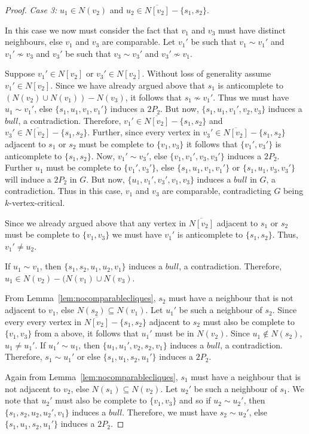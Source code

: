 \documentclass[11pt]{article}
\theoremstyle{definition}
\begin{document}
\begin{proof}
\noindent \textit{Case 3:} $u_1\in N(v_2)$ and $u_2\in\overline{N[v_2]}-\{s_1,s_2\}$.

In this case we now must consider the fact that $v_1$ and $v_3$ must have distinct neighbours, else $v_1$ and $v_3$ are comparable. Let $v_1'$ be such that $v_1\sim v_1'$ and $v_1'\nsim v_3$ and $v_3'$ be such that $v_3\sim v_3'$ and $v_3'\nsim v_1$. 

Suppose $v_1'\in N[v_2]$ or $v_3'\in N[v_2]$. Without loss of generality assume $v_1'\in N[v_2]$. Since we have already argued above that $s_1$ is anticomplete to $(N(v_2)\cup N(v_1))-N(v_3)$, it follows that $s_1\nsim v_1'$. Thus we must have $u_1\sim v_1'$, else $\{s_1,u_1,v_1,v_1'\}$ induces a $2P_2$. But now, $\{s_1,u_1,v_1',v_2,v_3\}$ induces a $bull$, a contradiction. Therefore,  $v_1'\in \overline{N[v_2]}-\{s_1,s_2\}$ and $v_3'\in \overline{N[v_2]}-\{s_1,s_2\}$. Further, since every vertex in $v_3'\in \overline{N[v_2]}-\{s_1,s_2\}$ adjacent to $s_1$ or $s_2$ must be complete to $\{v_1,v_3\}$ it follows that $\{v_1',v_3'\}$ is anticomplete to $\{s_1,s_2\}$. Now, $v_1'\sim v_3'$, else $\{v_1,v_1',v_3,v_3'\}$ induces a $2P_2$. Further $u_1$ must be complete to $\{v_1',v_3'\}$, else $\{s_1,u_1,v_1,v_1'\}$ or $\{s_1,u_1,v_3,v_3'\}$ will induce a $2P_2$ in $G$. But now, $\{u_1,v_1',v_3',v_1,v_3\}$ induces a $bull$ in $G$, a contradiction. Thus in this case, $v_1$ and $v_3$ are comparable, contradicting $G$ being $k$-vertex-critical.



 
Since we already argued above that any vertex in $\overline{N[v_2]}$ adjacent to $s_1$ or $s_2$ must be complete to $\{v_1,v_3\}$ we must have $v_1'$ is anticomplete to $\{s_1,s_2\}$. Thus, $v_1'\neq u_2$.


If $u_1\sim v_1$, then $\{s_1,s_2,u_1,u_2,v_1\}$ induces a $bull$, a contradiction. Therefore, $u_1\in N(v_2)-(N(v_1)\cup N(v_3)$. 

From Lemma~\ref{lem:nocomparablecliques}, $s_2$ must have a neighbour that is not adjacent to $v_1$, else $N(s_2)\subseteq N(v_1)$. Let $u_1'$ be such a neighbour of $s_2$. Since every every vertex in $\overline{N[v_2]}-\{s_1,s_2\}$ adjacent to $s_2$ must also be complete to $\{v_1,v_3\}$ from a above, it follows that $u_1'$ must be in $N(v_2)$. Since $u_1\not\in N(s_2)$, $u_1\neq u_1'$. If $u_1'\sim u_1$, then $\{u_1,u_1',v_2,s_2,v_1\}$ induces a $bull$, a contradiction. Therefore, $s_1\sim u_1'$ or else $\{s_1,u_1,s_2,u_1'\}$ induces a $2P_2$. 

Again from Lemma~\ref{lem:nocomparablecliques}, $s_1$ must have a neighbour that is not adjacent to $v_2$, else $N(s_1)\subseteq N(v_2)$. Let $u_2'$ be such a neighbour of $s_1$. We note that $u_2'$ must also be complete to $\{v_1,v_3\}$ and so if $u_2\sim u_2'$, then $\{s_1,s_2,u_2,u_2',v_1\}$ induces a $bull$. Therefore, we must have $s_2\sim u_2'$, else $\{s_1,u_1,s_2,u_1'\}$ induces a $2P_2$. 


\end{proof}
\end{document}

